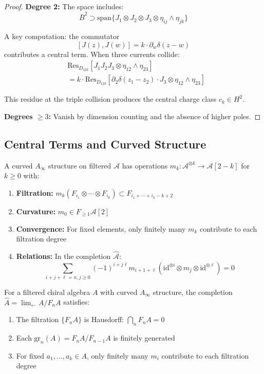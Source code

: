 \begin{proof}
\textbf{Degree 2:} The space includes:
\[
\bar{B}^2 \supset \text{span}\{J_1 \otimes J_2 \otimes J_3 \otimes \eta_{ij} \wedge \eta_{jk}\}
\]
 
A key computation: the commutator
\[
[J(z), J(w)] = k \cdot \partial_w\delta(z-w)
\]
contributes a central term. When three currents collide:
\begin{align}
&\text{Res}_{D_{123}}[J_1J_2J_3 \otimes \eta_{12} \wedge \eta_{23}] \\
&= k \cdot \text{Res}_{D_{123}}[\partial_2\delta(z_1-z_2) \cdot J_3 \otimes \eta_{12} \wedge \eta_{23}]
\end{align}
 
This residue at the triple collision produces the central charge class $c_k \in H^2$.
 
\textbf{Degrees $\geq 3$:} Vanish by dimension counting and the absence of higher poles.
\end{proof}
 
\subsection{Central Terms and Curved Structure}

\begin{definition}
A curved $A_\infty$ structure on filtered $\mathcal{A}$ has operations $m_k: \mathcal{A}^{\otimes k} \to \mathcal{A}[2-k]$ for $k \geq 0$ with:
\begin{enumerate}
\item \textbf{Filtration:} $m_k(F_{i_1} \otimes \cdots \otimes F_{i_k}) \subset F_{i_1+\cdots+i_k-k+2}$
\item \textbf{Curvature:} $m_0 \in F_{\geq 1}\mathcal{A}[2]$
\item \textbf{Convergence:} For fixed elements, only finitely many $m_k$ contribute to each filtration degree
\item \textbf{Relations:} In the completion $\widehat{\mathcal{A}}$:
   $$\sum_{i+j+\ell=n, j \geq 0} (-1)^{i+j\ell} m_{i+1+\ell}(\text{id}^{\otimes i} \otimes m_j \otimes \text{id}^{\otimes \ell}) = 0$$
\end{enumerate}
\end{definition}

\begin{proposition}\label{prop:curved-convergence}
For a filtered chiral algebra $A$ with curved $A_\infty$ structure, the completion $\hat{A} = \lim_{\leftarrow} A/F_nA$ satisfies:
\begin{enumerate}
\item The filtration $\{F_nA\}$ is Hausdorff: $\bigcap_n F_nA = 0$
\item Each $\text{gr}_n(A) = F_nA/F_{n-1}A$ is finitely generated
\item For fixed $a_1, \ldots, a_k \in A$, only finitely many $m_i$ contribute to each filtration degree
\end{enumerate}
\end{proposition}

